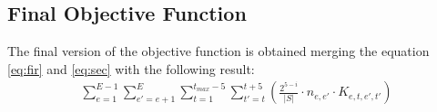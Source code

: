 \documentclass[12pt]{article}
\begin{document}
\subsection{Final Objective Function}
The final version of the objective function is obtained merging the equation \ref{eq:fir} and \ref{eq:sec} with the following result:
\begin{equation}
  \begin{gathered}
    \sum_{e=1}^{E-1}\sum_{e'=e+1}^{E}\sum_{t=1}^{t_{max}-5}\sum_{t'=t}^{t+5} (\frac{2^{5-i}}{|S|} \cdot n_{e,e'} \cdot K_{e,t,e',t'})
    \label{eq:final}
  \end{gathered}
\end{equation}
\end{document}
